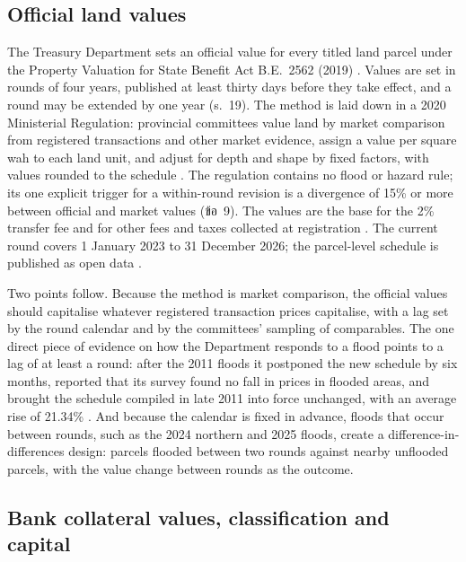 \subsection{Official land values}

The Treasury Department sets an official value for every titled land parcel under the Property Valuation for State Benefit Act B.E.~2562 (2019) \citep{th2019valuationact}. Values are set in rounds of four years, published at least thirty days before they take effect, and a round may be extended by one year (s.~19). The method is laid down in a 2020 Ministerial Regulation: provincial committees value land by market comparison from registered transactions and other market evidence, assign a value per square wah to each land unit, and adjust for depth and shape by fixed factors, with values rounded to the schedule \citep{th2020appraisalmr}. The regulation contains no flood or hazard rule; its one explicit trigger for a within-round revision is a divergence of 15\% or more between official and market values (ข้อ~9). The values are the base for the 2\% transfer fee and for other fees and taxes collected at registration \citep{dol2026fees}. The current round covers 1 January 2023 to 31 December 2026; the parcel-level schedule is published as open data \citep{treasury2026opendata}.

Two points follow. Because the method is market comparison, the official values should capitalise whatever registered transaction prices capitalise, with a lag set by the round calendar and by the committees' sampling of comparables. The one direct piece of evidence on how the Department responds to a flood points to a lag of at least a round: after the 2011 floods it postponed the new schedule by six months, reported that its survey found no fall in prices in flooded areas, and brought the schedule compiled in late 2011 into force unchanged, with an average rise of 21.34\% \citep{mgr2012appraisal}. And because the calendar is fixed in advance, floods that occur between rounds, such as the 2024 northern and 2025 floods, create a difference-in-differences design: parcels flooded between two rounds against nearby unflooded parcels, with the value change between rounds as the outcome.

\subsection{Bank collateral values, classification and capital}

